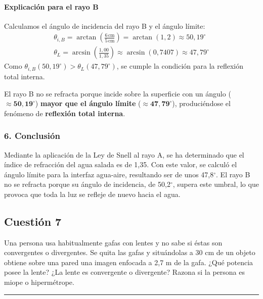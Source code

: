 \paragraph*{Explicación para el rayo B}
Calculamos el ángulo de incidencia del rayo B y el ángulo límite:
\begin{gather}
    \theta_{i,B} = \arctan\left(\frac{6\,\text{cm}}{5\,\text{cm}}\right) = \arctan(1,2) \approx 50,19^{\circ} \\
    \theta_L = \arcsin\left(\frac{1,00}{1,35}\right) \approx \arcsin(0,7407) \approx 47,79^{\circ}
\end{gather}
Como $\theta_{i,B} (50,19^{\circ}) > \theta_L (47,79^{\circ})$, se cumple la condición para la reflexión total interna.
\begin{cajaresultado}
    El rayo B no se refracta porque incide sobre la superficie con un ángulo ($\boldsymbol{\approx 50,19^{\circ}}$) \textbf{mayor que el ángulo límite} ($\boldsymbol{\approx 47,79^{\circ}}$), produciéndose el fenómeno de \textbf{reflexión total interna}.
\end{cajaresultado}

\subsubsection*{6. Conclusión}
\begin{cajaconclusion}
Mediante la aplicación de la Ley de Snell al rayo A, se ha determinado que el índice de refracción del agua salada es de 1,35. Con este valor, se calculó el ángulo límite para la interfaz agua-aire, resultando ser de unos 47,8$^{\circ}$. El rayo B no se refracta porque su ángulo de incidencia, de 50,2$^{\circ}$, supera este umbral, lo que provoca que toda la luz se refleje de nuevo hacia el agua.
\end{cajaconclusion}

\newpage

\subsection{Cuestión 7}
\label{subsec:C7_2022_jul_ord}

\begin{cajaenunciado}
Una persona usa habitualmente gafas con lentes y no sabe si éstas son convergentes o divergentes. Se quita las gafas y situándolas a 30 cm de un objeto obtiene sobre una pared una imagen enfocada a 2,7 m de la gafa. ¿Qué potencia posee la lente? ¿La lente es convergente o divergente? Razona si la persona es miope o hipermétrope.
\end{cajaenunciado}
\hrule

